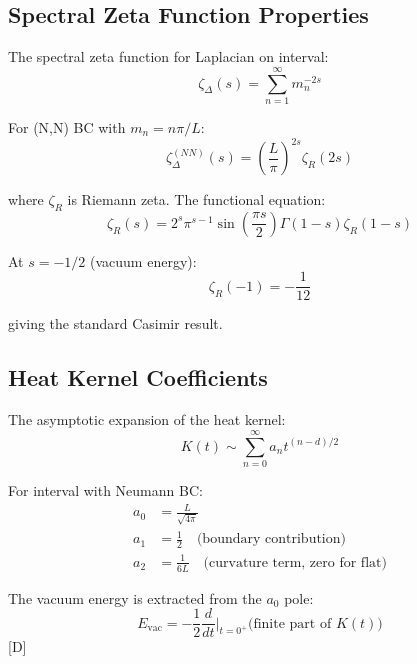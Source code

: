 \documentclass[11pt,a4paper]{article}
\newcommand{\tagD}{\textcolor{blue!70!black}{[D]}}
\begin{document}
\subsection{Spectral Zeta Function Properties}

The spectral zeta function for Laplacian on interval:
\begin{equation}
\label{eq:spec-zeta-def}
\zeta_\Delta(s) = \sum_{n=1}^\infty m_n^{-2s}
\end{equation}

For (N,N) BC with $m_n = n\pi/L$:
\begin{equation}
\label{eq:spec-zeta-NN}
\zeta_\Delta^{(NN)}(s) = \left(\frac{L}{\pi}\right)^{2s} \zeta_R(2s)
\end{equation}

where $\zeta_R$ is Riemann zeta. The functional equation:
\begin{equation}
\label{eq:zeta-functional}
\zeta_R(s) = 2^s \pi^{s-1} \sin\left(\frac{\pi s}{2}\right) \Gamma(1-s) \zeta_R(1-s)
\end{equation}

At $s = -1/2$ (vacuum energy):
\begin{equation}
\label{eq:zeta-m1half}
\zeta_R(-1) = -\frac{1}{12}
\end{equation}

giving the standard Casimir result.

\subsection{Heat Kernel Coefficients}

The asymptotic expansion of the heat kernel:
\begin{equation}
\label{eq:heat-asymp}
K(t) \sim \sum_{n=0}^\infty a_n t^{(n-d)/2}
\end{equation}

For interval with Neumann BC:
\begin{align}
\label{eq:a0-coeff}
a_0 &= \frac{L}{\sqrt{4\pi}} \\
\label{eq:a1-coeff}
a_1 &= \frac{1}{2} \quad \text{(boundary contribution)} \\
\label{eq:a2-coeff}
a_2 &= \frac{1}{6L} \quad \text{(curvature term, zero for flat)}
\end{align}

The vacuum energy is extracted from the $a_0$ pole:
\begin{equation}
\label{eq:evac-from-heat}
E_{\text{vac}} = -\frac{1}{2} \frac{d}{dt}\bigg|_{t=0^+} \text{(finite part of } K(t) \text{)}
\end{equation}
\tagD
\end{document}
